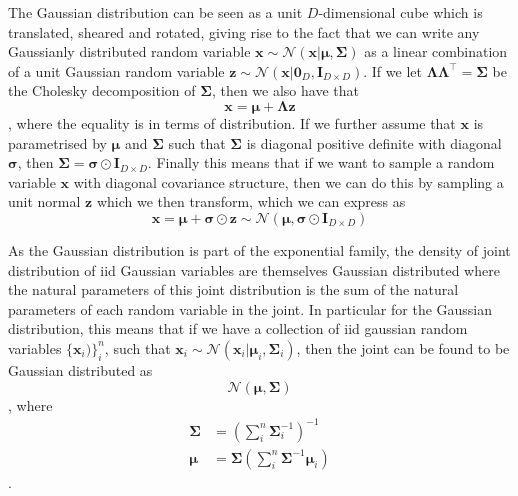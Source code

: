 The Gaussian distribution can be seen as a unit $D$-dimensional cube which is
translated, sheared and rotated, giving rise to the fact that we can write any
Gaussianly distributed random variable $\bm{x} \sim \mathcal{N}(\bm{x} |
\bm{\mu}, \bm{\Sigma})$ as a linear combination of a unit Gaussian random
variable $\bm{z} \sim \mathcal{N}(\bm{x} | \bm{0}_D, \bm{I}_{D \times D})$. If
we let $\bm{\Lambda} \bm{\Lambda}^{\top} = \bm{\Sigma}$ be the Cholesky
decomposition\cite[p.~100-102]{Press:2007:NRE:1403886} of $\bm{\Sigma}$, then we
also have that
\begin{equation}
  \label{eq:sample_x}
  \bm{x} = \bm{\mu} + \bm{\Lambda}\bm{z}
\end{equation},
where the equality is in terms of distribution. If we further assume that
$\bm{x}$ is parametrised by $\bm{\mu}$ and $\bm{\Sigma}$ such that $\bm{\Sigma}$
is diagonal positive definite with diagonal $\bm{\sigma}$, then $\bm{\Sigma} =
\bm{\sigma} \odot \bm{I}_{D \times D}$. Finally this means that if we want to
sample a random variable $\bm{x}$ with diagonal covariance structure, then we
can do this by sampling a unit normal $\bm{z}$ which we then transform, which we can express as
\begin{equation}
  \label{eq:sample_x_diag_covariance}
  \bm{x} = \bm{\mu} + \bm{\sigma} \odot \bm{z} \sim \mathcal{N}(\bm{\mu}, \bm{\sigma} \odot \bm{I}_{D \times D})
\end{equation}

As the Gaussian distribution is part of the exponential family, the density of
joint distribution of iid Gaussian variables are themselves Gaussian distributed
where the natural parameters of this joint distribution is the sum of the
natural parameters of each random variable in the joint. In particular for the
Gaussian distribution, this means that if we have a collection of iid gaussian
random variables $\{\bm{x}_i)\}_i^n$, such that $\bm{x}_i \sim
\mathcal{N}(\bm{x}_i | \bm{\mu}_i, \bm{\Sigma}_{i})$, then the joint
can be found to be Gaussian distributed as
\begin{equation*}
  \mathcal{N}(\bm{\mu}, \bm{\Sigma})
\end{equation*},
where
\begin{align}
  \bm{\Sigma} & = \left( \sum_i^n \bm{\Sigma}_i^{-1} \right)^{-1} \label{eq:joint_indep_normal_covariance}\\ 
  \bm{\mu} & = \bm{\Sigma}\left( \sum_i^n \bm{\Sigma}^{-1} \bm{\mu}_i \right) \label{eq:joint_indep_normal_mean}
\end{align}\cite[p.~78-84]{Bishop:2006}.

